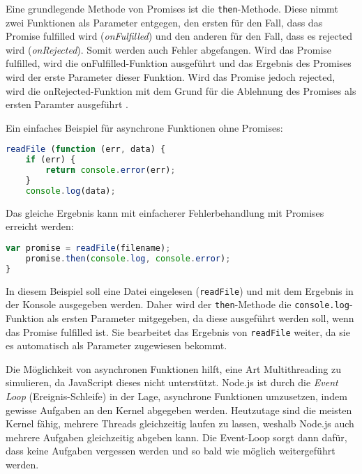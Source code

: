 Eine grundlegende Methode von Promises ist die \texttt{then}-Methode. Diese nimmt zwei Funktionen als Parameter entgegen, den ersten für den Fall, dass das Promise fulfilled wird (\textit{onFulfilled}) und den anderen für den Fall, dass es rejected wird (\textit{onRejected}). Somit werden auch Fehler abgefangen. Wird das Promise fulfilled, wird die onFulfilled-Funktion ausgeführt und das Ergebnis des Promises wird der erste Parameter dieser Funktion. Wird das Promise jedoch rejected, wird die onRejected-Funktion mit dem Grund für die Ablehnung des Promises als ersten Paramter ausgeführt \cite{proma}.

Ein einfaches Beispiel für asynchrone Funktionen ohne Promises: \\

\begin{lstlisting}[title=Asynchrone Funktion ohne Promises, language=JavaScript]
readFile (function (err, data) {
	if (err) {
		return console.error(err);
	}
	console.log(data);
\end{lstlisting}

Das gleiche Ergebnis kann mit einfacherer Fehlerbehandlung mit Promises erreicht werden: \\

\begin{lstlisting}[title=Asynchrone Funktion mit Promises, language=JavaScript]
	var promise = readFile(filename);
	promise.then(console.log, console.error);
}
\end{lstlisting}

In diesem Beispiel soll eine Datei eingelesen (\texttt{readFile}) und mit dem Ergebnis in der Konsole ausgegeben werden. Daher wird der \texttt{then}-Methode die \texttt{console.log}-Funktion als ersten Parameter mitgegeben, da diese ausgeführt werden soll, wenn das Promise fulfilled ist. Sie bearbeitet das Ergebnis von \texttt{readFile} weiter, da sie es automatisch als Parameter zugewiesen bekommt.


Die Möglichkeit von asynchronen Funktionen hilft, eine Art Multithreading zu simulieren, da JavaScript dieses nicht unterstützt. Node.js ist durch die \textit{Event Loop} (Ereignis-Schleife) in der Lage, asynchrone Funktionen umzusetzen, indem gewisse Aufgaben an den Kernel abgegeben werden. Heutzutage sind die meisten Kernel fähig, mehrere Threads gleichzeitig laufen zu lassen, weshalb Node.js auch mehrere Aufgaben gleichzeitig abgeben kann. Die Event-Loop sorgt dann dafür, dass keine Aufgaben vergessen werden und so bald wie möglich weitergeführt werden.

